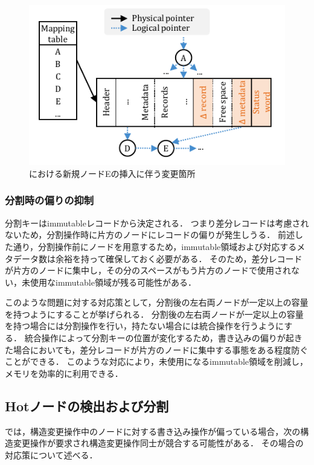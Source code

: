 \begin{figure}[t]
    \centering
    \includegraphics{./figures/Bc-inner_nodes.pdf}
    \caption{\Bctree{}における新規ノードEの挿入に伴う変更箇所}
    \label{fig:bc_tree_inner_nodes}
\end{figure}

\subsubsection{分割時の偏りの抑制}

分割キーはimmutableレコードから決定される．
つまり差分レコードは考慮されないため，分割操作時に片方のノードにレコードの偏りが発生しうる．
前述した通り，分割操作前にノードを用意するため，immutable領域および対応するメタデータ数は余裕を持って確保しておく必要がある．
そのため，差分レコードが片方のノードに集中し，その分のスペースがもう片方のノードで使用されない，未使用なimmutable領域が残る可能性がある．

このような問題に対する対応策として，分割後の左右両ノードが一定以上の容量を持つようにすることが挙げられる．
分割後の左右両ノードが一定以上の容量を持つ場合には分割操作を行い，持たない場合には統合操作を行うようにする．
統合操作によって分割キーの位置が変化するため，書き込みの偏りが起きた場合においても，差分レコードが片方のノードに集中する事態をある程度防ぐことができる．
このような対応により，未使用になるimmutable領域を削減し，メモリを効率的に利用できる．

\subsection{Hotノードの検出および分割}

\Bctree{}では，構造変更操作中のノードに対する書き込み操作が偏っている場合，次の構造変更操作が要求され構造変更操作同士が競合する可能性がある．
その場合の対応策について述べる．

